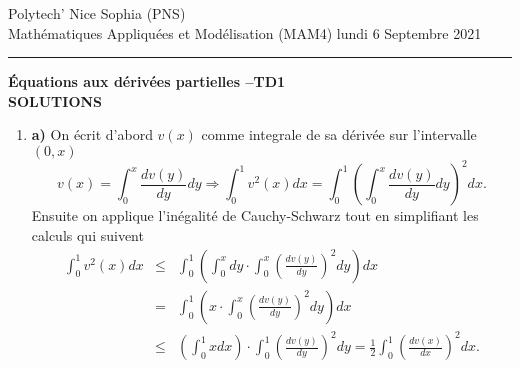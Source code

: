 \documentclass[12pt,a4paper]{article}
\begin{document}
 \hfill Polytech' Nice Sophia (PNS)\\
\noindent Math\'ematiques Appliqu\'ees et Mod\'elisation (MAM4) \hfill lundi 6 Septembre 2021 \\

\hrule

\bigskip
\bigskip
\begin{center}{\bf \'Equations aux d\'eriv\'ees partielles --TD1 \\
SOLUTIONS}\end{center}

\bigskip

\parskip 12pt

\begin{enumerate}
\item

{\bf a)} On \'ecrit d'abord $v(x)$ comme integrale de sa d\'eriv\'ee sur
l'intervalle $(0,x)$ 
$$
v(x) = \int_0^x\frac{d v(y)}{dy}dy\Rightarrow \int_0^1 v^2(x) dx=  \int_0^1 \left(\int_0^x\frac{d v(y)}{dy}dy\right)^2dx.
$$
Ensuite on applique l'in\'egalit\'e de Cauchy-Schwarz tout en
simplifiant les calculs qui suivent
$$
\begin{array}{lcl}
\displaystyle\int_0^1 v^2(x) dx &\le& \displaystyle\int_0^1 \left(\int_0^x dy \cdot
  \int_0^x\left(\frac{d v(y)}{dy}\right)^2dy\right)dx\\
&= &\displaystyle\int_0^1 \left( x\cdot \int_0^x\left(\frac{d v(y)}{dy}\right)^2dy\right)dx\\
&\le & \displaystyle\left(\int_0^1xdx \right)\cdot \int_0^1\left(\frac{d v(y)}{dy}\right)^2dy =
\frac{1}{2} \int_0^1\left(\frac{d v(x)}{dx}\right)^2dx.
\end{array}
$$


\end{enumerate}
\end{document}
